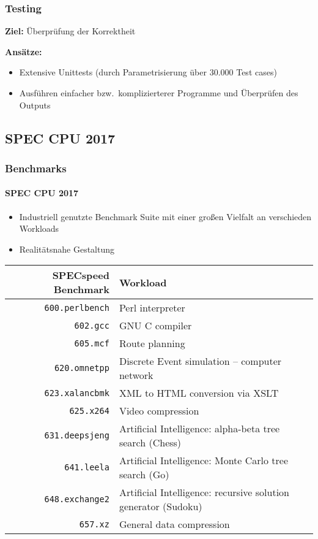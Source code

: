 \begin{frame}
	\frametitle{Testing}
	
	\textbf{Ziel:} Überprüfung der Korrektheit
	
	\vspace{0.5cm}
	
	\textbf{Ansätze:}
	\begin{itemize}
		\item Extensive Unittests (durch Parametrisierung über 30.000 Test cases)
		\item Ausführen einfacher bzw.\ komplizierterer Programme und Überprüfen des Outputs
	\end{itemize}
\end{frame}
\subsection{SPEC CPU 2017} %
\begin{frame}
	\frametitle{Benchmarks}
	\framesubtitle{SPEC CPU 2017}
	
	\begin{itemize}
		\item Industriell genutzte Benchmark Suite mit einer großen Vielfalt an verschieden Workloads
		\item Realitätsnahe Gestaltung
	\end{itemize}
	\pause
	\begin{table}
		\centering
		\small
		\begin{tabular}{rl}
			\toprule
			\textbf{SPECspeed Benchmark} & \textbf{Workload}\\
			\midrule
			\texttt{600.perlbench} & Perl interpreter\\
			\texttt{602.gcc} & GNU C compiler\\
			\texttt{605.mcf} & Route planning\\
			\texttt{620.omnetpp} & Discrete Event simulation -- computer network\\
			\texttt{623.xalancbmk} & XML to HTML conversion via XSLT\\
			\texttt{625.x264} & Video compression\\
			\texttt{631.deepsjeng} & Artificial Intelligence: alpha-beta tree search (Chess)\\
			\texttt{641.leela} & Artificial Intelligence: Monte Carlo tree search (Go)\\
			\texttt{648.exchange2} & Artificial Intelligence: recursive solution generator (Sudoku)\\
			\texttt{657.xz} & General data compression\\
			\bottomrule
		\end{tabular}
	\end{table}
	
\end{frame}
